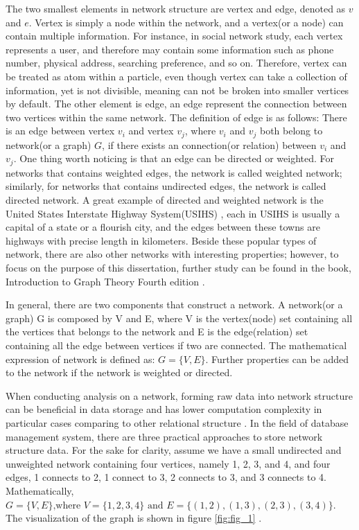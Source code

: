 \documentclass[12pt]{article}
\begin{document}
The two smallest elements in network structure are vertex and edge, denoted as $v$ and $e$. Vertex is simply a node within the network, and a vertex(or a node) can contain multiple information. For instance, in social network study, each vertex represents a user, and therefore may contain some information such as phone number, physical address, searching preference, and so on.  Therefore, vertex can be treated as atom within a particle, even though vertex can take a collection of information, yet is not divisible, meaning can not be broken into smaller vertices by default. The other element is edge, an edge represent the connection between two vertices within the same network. The definition of edge is as follows:  There is an edge between vertex $v_i$ and vertex $v_j$, where $v_i$ and $v_j$ both belong to network(or a graph) $G$, if there exists an connection(or relation) between $v_i$ and $v_j$. One thing worth noticing is that an edge can be directed or weighted. For networks that contains weighted edges, the network is called weighted network; similarly, for networks that contains undirected edges, the network is called directed network. A great example of directed and weighted network is the United States Interstate Highway System(USIHS) \cite{14}, each in USIHS is usually a capital of a state or a flourish city, and the edges between these towns are highways with precise length in kilometers. Beside these popular types of network, there are also other networks with interesting properties; however, to focus on the purpose of this dissertation, further study can be found in the book, Introduction to Graph Theory Fourth edition \cite{15}.

\bigbreak

In general, there are two components that construct a network. A network(or a graph) G is composed by V and E, where V is the vertex(node) set containing all the vertices that belongs to the network and E is the edge(relation) set containing all the edge between vertices if two are connected. The mathematical expression of network is defined as: $G = \{V, E\}$. Further properties can be added to the network if the network is weighted or directed. 

\bigbreak

When conducting analysis on a network, forming raw data into network structure can be beneficial in data storage and has lower computation complexity in particular cases comparing to other relational structure \cite{6}. In the field of database management system, there are three practical approaches to store network structure data. For the sake for clarity, assume we have a small undirected and unweighted network containing four vertices, namely 1, 2, 3, and 4, and four edges, 1 connects to 2, 1 connect to 3, 2 connects to 3, and 3 connects to 4. Mathematically, $G = \{V, E\} \text{,where }V=\{1,2,3,4\}\text{ and }E=\{(1,2),(1,3),(2,3),(3,4)\}$. The visualization of the graph is shown in figure \ref{fig:fig_1} .
\end{document}

